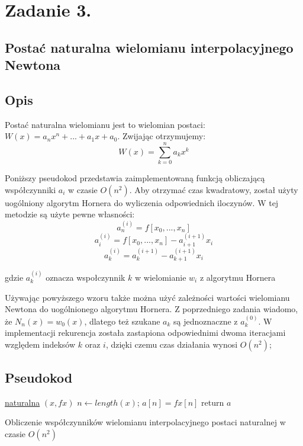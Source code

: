 \documentclass[11pt, a4paper]{article}
\begin{document}
    \section{Zadanie 3.}
    \subsection{Postać naturalna wielomianu interpolacyjnego Newtona}
    \subsection{Opis}
    Postać naturalna wielomianu jest to wielomian postaci: $W(x) = a_{n}x^n + ... + a_{1}x + a_{0}$. Zwijając otrzymujemy:
    $$ W(x) = \sum_{k = 0}^{n} a_{k}x^{k}$$

    Poniższy pseudokod przedstawia zaimplementowaną funkcją obliczającą współczynniki $a_{i}$ w czasie $O(n^2)$. Aby otrzymać czas kwadratowy, został użyty uogólniony algorytm Hornera do wyliczenia odpowiednich iloczynów. W tej metodzie są użyte pewne własności:
    $$ a_{n}^{(i)} = f[x_{0},...,x_{n}]$$
    $$ a_{i}^{(i)} = f[x_{0},...,x_{n}] - a_{i+1}^{(i+1)}x_{i}$$
    $$ a_{k}^{(i)} = a_{k}^{(i+1)} - a_{k+1}^{(i+1)}x_{i} $$
    \centerline{gdzie $a_{k}^{(i)}$ oznacza wspołczynnik $k$ w wielomianie $w_{i}$ z algorytmu Hornera}
    
    Używając powyższego wzoru także można użyć zależności wartości wielomianu Newtona do uogólnionego algorytmu Hornera. Z poprzedniego zadania wiadomo, że $N_{n}(x) = w_{0}(x)$, dlatego też szukane $a_{k}$ są jednoznaczne z $a_{k}^{(0)}$. W implementacji rekurencja została zastapiona odpowiednimi dwoma iteracjami względem indeksów $k$ oraz $i$, dzięki czemu czas działania wynosi $O(n^2)$;
    \subsection{Pseudokod}
    \begin{algorithm}[H]

        \underline{naturalna} $(x , fx)$\;
        $n \gets length(x)$; $a[n] = fx[n]$\; 
        return $a$\;
        \caption{Obliczenie współczynników wielomianu interpolacyjnego postaci naturalnej w czasie $O(n^2)$}
    \end{algorithm}
\end{document}
